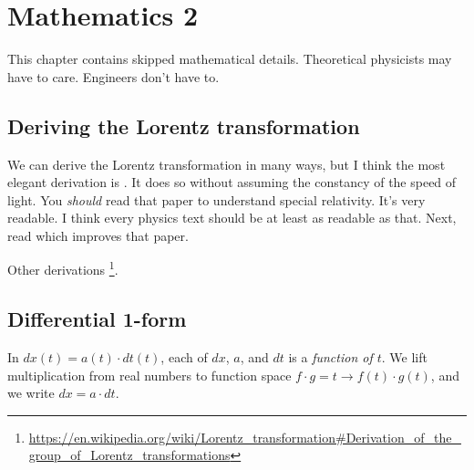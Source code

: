 \chapter{Mathematics 2}

This chapter contains skipped mathematical details.
Theoretical physicists may have to care.
Engineers don't have to.

\section{Deriving the Lorentz transformation}

\label{sec:derive-lorentz-transform}

%
We can derive the Lorentz transformation in many ways,
but I think the most elegant derivation is \cite{pal2003nothing}.
It does so without assuming the constancy of the speed of light.
You \emph{should} read that paper to understand special relativity.
It's very readable.
I think every physics text should be at least as readable as that.
Next, read \cite{gannett2007nothing} which improves that paper.

Other derivations%
\footnote{\url{https://en.wikipedia.org/wiki/Lorentz_transformation\#Derivation_of_the_group_of_Lorentz_transformations}}.




\section{Differential 1-form}




In \( dx(t) = a(t) \cdot dt(t) \),
each of \(dx\), \(a\), and \(dt\) is a \emph{function of \(t\)}.
We lift multiplication from real numbers to function space \( f \cdot g = t \to f(t) \cdot g(t) \),
and we write \( dx = a \cdot dt \).

